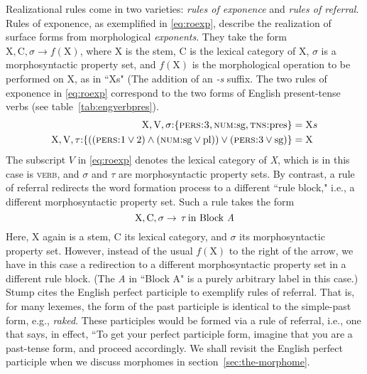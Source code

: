 Realizational rules come in two varieties:
\emph{rules of exponence} and \emph{rules of referral}. Rules of exponence, as exemplified in \eqref{eq:roexp}, describe the 
realization of surface forms from morphological \emph{exponents}. They take the form 
$\text{X},\text{C},\sigma \to f(\text{X})$, where X is the stem, C is the lexical category of X, 
$\sigma$ is a morphosyntactic property set,  and $f(\text{X})$ is the morphological operation to be performed 
on X, as in ``Xs" (The addition of an \emph{-s} suffix. The two rules of exponence in \eqref{eq:roexp}  
correspond to the two forms 
of English present-tense verbs (see table~\ref{tab:engverbpres}). 
\begin{align}
\label{eq:roexp}
	\text{X},\text{V},\sigma\text{:}\{ \textsc{pers:3}\text{,} \, \textsc{num:}\text{sg,} \, \textsc{tns:}\text{pres} \} &= \text{X}s \\ \label{eq:roexp1}
	\text{X},\text{V},\tau\text{:}\{((\textsc{pers:}\text{1}\vee\text{2}) \land (\textsc{num:}\text{sg}\vee\text{pl})) \vee (\textsc{pers:}3 \vee \text{sg})\} &= \text{X} 
\end{align}
The subscript $V$ in \eqref{eq:roexp} denotes the lexical category of \textit{X}, which is  
in this case is \textsc{verb}, 
and $\sigma$ and $\tau$ are morphosyntactic property sets. 
By contrast, a rule of referral redirects the word formation process to a different ``rule block," i.e.,
a different morphosyntactic property set. Such a rule takes the form 
\begin{equation}
\label{eq:ror}
\text{X}, \text{C}, \sigma \to \, \tau \, \text{in Block \textit{A}}
\end{equation}
Here, X again is a stem, 
C its lexical category, and $\sigma$ its morphosyntactic property set. However, instead of the usual $f(\text{X})$ 
to the right of the arrow, we have in this case a redirection to a 
different morphosyntactic property set in a different rule block. (The \textit{A} in ``Block A" 
is a purely arbitrary label in this case.) Stump cites the English perfect participle 
to exemplify rules of referral. That is, for many lexemes, the form of the 
past participle is identical to the simple-past form, e.g., \textit{raked}. 
These participles would be formed via a rule of referral, i.e., one that 
says, in effect, ``To get your perfect participle form, imagine that you 
are a past-tense form, and proceed accordingly.  We shall revisit the English 
perfect participle when we discuss morphomes 
in section~\ref{sec:the-morphome}.

